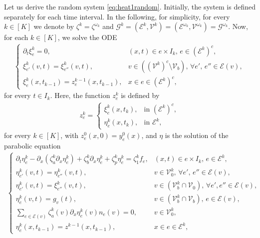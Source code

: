 \documentclass[a4paper, 10pt, english]{article}
\begin{document}
Let us derive the random system \eqref{eq:heat1random}. Initially, the system is defined separately for each time interval. In the following, for simplicity, for every $k\in [K]$ we denote by $\zeta^k = \zeta^{\omega_k}$ and $\mathcal{G}^k=(\mathcal{E}^k,\mathcal{V}^k) = (\mathcal{E}^{\omega_k},\mathcal{V}^{\omega_k})=\mathcal{G}^{\omega_k}$. Now, for each $k \in [K]$, we solve the ODE 
\begin{align}\label{eq:random_interval2}
    \begin{cases}
        \partial_t \xi_e^k = 0, & (x,t) \in e \times I_k, \, e \in \left( \mathcal{E}^k \right)^c, \\
        \xi_{e'}^k(v,t) = \xi_{e''}^{k}(v,t), &v\in \left( (\mathcal{V}^k)^c \setminus \mathcal{V}_b \right),\,\forall e',\, e'' \in \mathcal{E}(v), \\
        \xi_e^k(x,t_{k-1}) = z_e^{k-1}(x,t_{k-1}), & x \in e \in \left( \mathcal{E}^k \right)^c,
    \end{cases}
\end{align}
for every $t\in I_k$. Here, the function $z_e^{k}$ is defined by
\begin{align}\label{eq:definition_z}
      z_e^{k} = \begin{cases}
          \xi_e^{k}(x,t_{k}), & \text{in } \left( \mathcal{E}^k \right)^c, \\
          \eta_e^{k}(x,t_{k}), & \text{in } \mathcal{E}^k,
      \end{cases}
\end{align}
for every $k \in [K]$, with $z^0_e(x,0) = y_e^0(x)$, and $\eta$ is the solution of the parabolic equation
\begin{align}\label{eq:random_interval1}
      \begin{cases}
        \partial_t \eta_e^k - \partial_{x}(\zeta^k_a \partial_x \eta^k_e) + \zeta_b^k \partial_x \eta_e^k + \zeta_p^k \eta_e^k = \zeta^k_1 f_e, & (x,t) \in e \times I_k, \, e \in \mathcal{E}^k, \\
        \eta_{e'}^k(v,t) = \eta_{e''}^k(v,t), & v \in \mathcal{V}_0^k,\, \forall e',\, e'' \in \mathcal{E}(v),\\
        \eta_{e'}^k(v,t) = \xi_{e''}^k(v,t), & v \in (\mathcal{V}^k_b \cap \mathcal{V}_0),\, \forall e', e'' \in \mathcal{E}(v), \\
        \eta_e^k(v,t) = g_v(t), & v \in (\mathcal{V}_b^k \cap \mathcal{V}_b),\, e \in \mathcal{E}(v), \\
        \sum_{e \in \mathcal{E}(v)}\zeta^k_a(v)\partial_x \eta_e^k(v) n_e(v) = 0, &v \in \mathcal{V}_0^k, \\
        \eta_e^k(x,t_{k-1}) = z^{k-1}(x,t_{k-1}), & x \in e \in \mathcal{E}^k,
      \end{cases}
\end{align}
\end{document}
